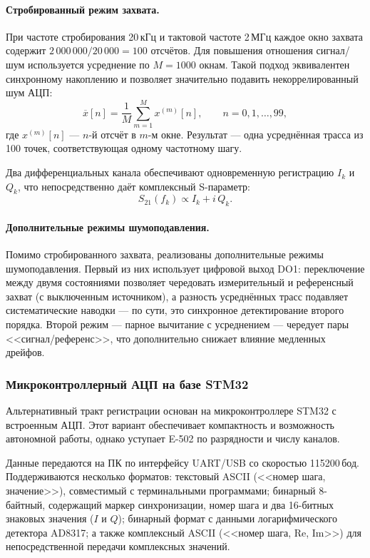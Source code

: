 \paragraph{Стробированный режим захвата.}
При частоте стробирования 20\,кГц и тактовой частоте 2\,МГц каждое окно
захвата содержит $2\,000\,000 / 20\,000 = 100$ отсчётов. Для повышения
отношения сигнал/шум используется усреднение по $M = 1000$ окнам. Такой
подход эквивалентен синхронному накоплению и позволяет значительно подавить
некоррелированный шум АЦП:
\begin{equation}
    \overline{x}[n] = \frac{1}{M}\sum_{m=1}^{M} x^{(m)}[n],
    \qquad n = 0, 1, \ldots, 99,
    \label{eq:window-avg}
\end{equation}
где $x^{(m)}[n]$ --- $n$-й отсчёт в $m$-м окне. Результат --- одна
усреднённая трасса из 100 точек, соответствующая одному частотному шагу.

Два дифференциальных канала обеспечивают одновременную регистрацию $I_k$ и
$Q_k$, что непосредственно даёт комплексный S-параметр:
\begin{equation}
    S_{21}(f_k) \propto I_k + i\,Q_k.
    \label{eq:s21-iq}
\end{equation}

\paragraph{Дополнительные режимы шумоподавления.}
Помимо стробированного захвата, реализованы дополнительные режимы
шумоподавления. Первый из них использует цифровой выход DO1: переключение
между двумя состояниями позволяет чередовать измерительный и референсный захват
(с выключенным источником), а разность усреднённых трасс подавляет
систематические наводки --- по сути, это синхронное детектирование второго
порядка. Второй режим --- парное вычитание с усреднением --- чередует пары
<<сигнал/референс>>, что дополнительно снижает влияние медленных дрейфов.

\subsubsection{Микроконтроллерный АЦП на базе STM32}

Альтернативный тракт регистрации основан на микроконтроллере STM32 с
встроенным АЦП. Этот вариант обеспечивает компактность и возможность
автономной работы, однако уступает E-502 по разрядности и числу каналов.

Данные передаются на ПК по интерфейсу UART/USB со скоростью 115200\,бод.
Поддерживаются несколько форматов: текстовый ASCII (<<номер шага, значение>>),
совместимый с терминальными программами; бинарный 8-байтный, содержащий маркер
синхронизации, номер шага и два 16-битных знаковых значения ($I$ и $Q$);
бинарный формат с данными логарифмического детектора AD8317; а также
комплексный ASCII (<<номер шага, Re, Im>>) для непосредственной передачи
комплексных значений.

